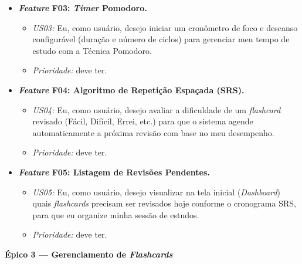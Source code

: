 \begin{itemize}
    \item \textbf{\textit{Feature} F03: \textit{Timer} Pomodoro.}
    \begin{itemize}
        \item \textit{US03:} Eu, como usuário, desejo iniciar um cronômetro de foco e descanso configurável (duração e número de ciclos) para gerenciar meu tempo de estudo com a Técnica Pomodoro.
        \item \textit{Prioridade:} deve ter.
    \end{itemize}
    \item \textbf{\textit{Feature} F04: Algoritmo de Repetição Espaçada (SRS).}
    \begin{itemize}
        \item \textit{US04:} Eu, como usuário, desejo avaliar a dificuldade de um \textit{flashcard} revisado (Fácil, Difícil, Errei, etc.) para que o sistema agende automaticamente a próxima revisão com base no meu desempenho.
        \item \textit{Prioridade:} deve ter.
    \end{itemize}
    \item \textbf{\textit{Feature} F05: Listagem de Revisões Pendentes.}
    \begin{itemize}
        \item \textit{US05:} Eu, como usuário, desejo visualizar na tela inicial (\textit{Dashboard}) quais \textit{flashcards} precisam ser revisados hoje conforme o cronograma SRS, para que eu organize minha sessão de estudos.
        \item \textit{Prioridade:} deve ter.
    \end{itemize}
\end{itemize}

\textbf{Épico 3 --- Gerenciamento de \textit{Flashcards}}

